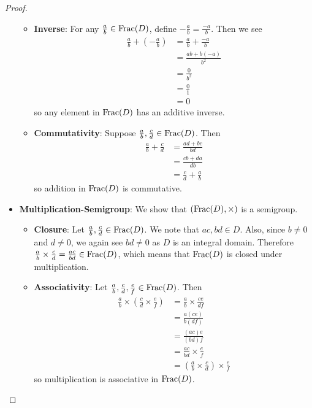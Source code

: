 \begin{proof}
\begin{itemize}
\begin{itemize}
            \item \textbf{Inverse}: For any $\frac ab \in \mathrm{Frac}(D)$, define $-\frac ab = \frac{-a}b$. Then we see
            \begin{align*}
                \frac ab + \left(-\frac ab\right) &= \frac ab + \frac{-a}b\\
                &= \frac{ab + b(-a)}{b^2}\\
                &= \frac 0{b^2}\\
                &= \frac 01\\
                &= 0
            \end{align*}
            so any element in $\mathrm{Frac}(D)$ has an additive inverse.
            
            \item \textbf{Commutativity}: Suppose $\frac ab, \frac cd \in \mathrm{Frac}(D)$. Then
            \begin{align*}
                \frac ab + \frac cd &= \frac{ad + bc}{bd}\\
                &= \frac{cb + da}{db}\\
                &= \frac cd + \frac ab
            \end{align*}
            so addition in $\mathrm{Frac}(D)$ is commutative.
        \end{itemize}

        \item \textbf{Multiplication-Semigroup}: We show that $(\mathrm{Frac}(D), \times)$ is a semigroup.
        \begin{itemize}
            \item \textbf{Closure}: Let $\frac ab, \frac cd \in \mathrm{Frac}(D)$. We note that $ac, bd \in D$. Also, since $b \neq 0$ and $d \neq 0$, we again see $bd \neq 0$ as $D$ is an integral domain. Therefore $\frac ab \times \frac cd = \frac{ac}{bd} \in \mathrm{Frac}(D)$, which means that $\mathrm{Frac}(D)$ is closed under multiplication.
            
            \item \textbf{Associativity}: Let $\frac ab, \frac cd, \frac ef \in \mathrm{Frac}(D)$. Then
            \begin{align*}
                \frac ab \times \left(\frac cd \times \frac ef\right) &= \frac ab \times \frac {ce}{df}\\
                &= \frac {a(ce)}{b(df)}\\
                &= \frac {(ac)e}{(bd)f}\\
                &= \frac {ac}{bd} \times \frac ef\\
                &= \left(\frac ab \times \frac cd\right) \times \frac ef
            \end{align*}
            so multiplication is associative in $\mathrm{Frac}(D)$.
        \end{itemize}


\end{itemize}
\end{proof}
